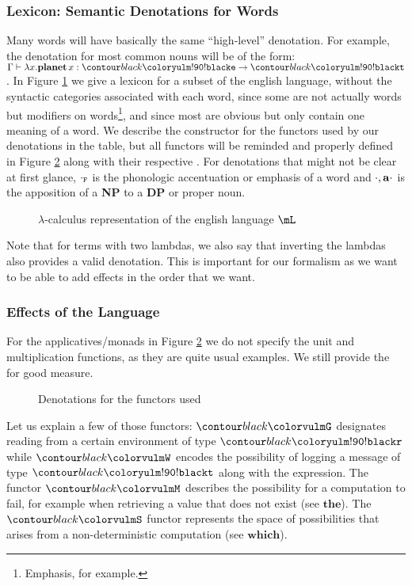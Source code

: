 \subsubsection{Lexicon: Semantic Denotations for Words}\label{subsec:lexicon}
Many words will have basically the same ``high-level'' denotation.
For example, the denotation for most common nouns will be of the form:
$\cont \lambda x. \w{planet} x: \e \to \t$.
In Figure \ref{fig:lexicon} we give a lexicon for a subset of the english
language, without the syntactic categories associated with each word, since
some are not actually words but modifiers on words\footnote{Emphasis,
	for example.}, and since most are obvious but only contain one meaning of a
word.
We describe the constructor for the functors used by our denotations in the
table, but all functors will be reminded and properly defined in Figure
\ref{fig:functors} along with their respective \fmap.
For denotations that might not be clear at first glance, $\cdot_{\tt F}$ is the
phonologic accentuation or emphasis of a word and ${\cdot, \bf a \cdot}$ is the
apposition of a \textbf{NP} to a \textbf{DP} or proper noun.
\begin{figure*}
	\centering
	\caption{$\lambda$-calculus representation of the english language $\mL$}
	\label{fig:lexicon}
\end{figure*}
Note that for terms with two lambdas, we also say that inverting the lambdas also provides a valid denotation.
This is important for our formalism as we want to be able to add effects in the order that we want.

\subsubsection{Effects of the Language}\label{subsec:effects}
For the applicatives/monads in Figure \ref{fig:functors} we do not specify the unit and multiplication functions, as they are quite usual examples.
We still provide the \fmap{} for good measure.

\begin{figure*}
	\centering
	\caption{Denotations for the functors used}
	\label{fig:functors}
\end{figure*}

Let us explain a few of those functors: $\f G$ designates reading from a certain environment of type $\r$ while $\f W$ encodes the possibility of logging a message of type $\t$ along with the expression.
The functor $\f M$ describes the possibility for a computation to fail, for example when retrieving a value that does not exist (see $\mathbf{the}$).
The $\f S$ functor represents the space of possibilities that arises from a non-deterministic computation (see $\mathbf{which}$).

